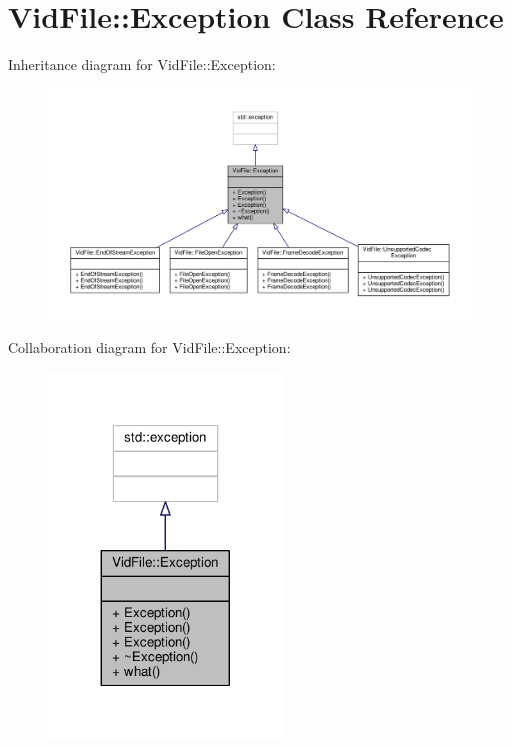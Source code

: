 \hypertarget{classVidFile_1_1Exception}{}\section{Vid\+File\+:\+:Exception Class Reference}
\label{classVidFile_1_1Exception}


Inheritance diagram for Vid\+File\+:\+:Exception\+:
\nopagebreak
\begin{figure}[H]
\begin{center}
\leavevmode
\includegraphics[width=350pt]{dc/d65/classVidFile_1_1Exception__inherit__graph}
\end{center}
\end{figure}


Collaboration diagram for Vid\+File\+:\+:Exception\+:
\nopagebreak
\begin{figure}[H]
\begin{center}
\leavevmode
\includegraphics[width=176pt]{d3/da5/classVidFile_1_1Exception__coll__graph}
\end{center}
\end{figure}
